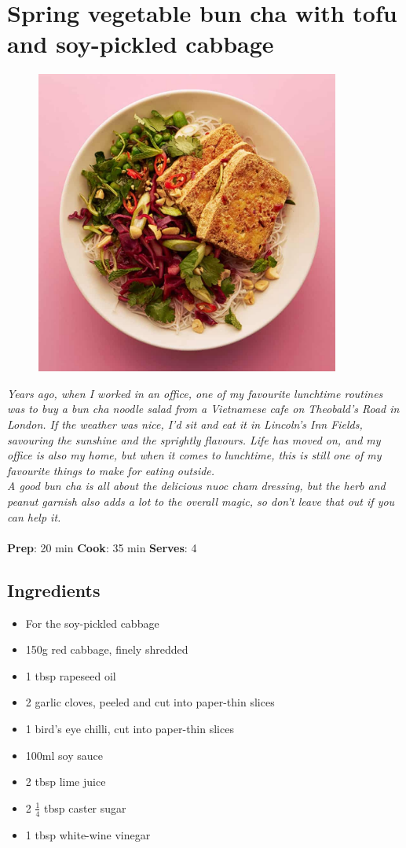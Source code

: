 \documentclass{book}
\begin{document}
\section{Spring vegetable bun cha with tofu and soy-pickled cabbage}
\begin{figure}
\centering\includegraphics[width=10cm,height=10cm,keepaspectratio]{Recipe_Pictures/Spring_vegetable_bun_cha_with_tofu_and_soy-pickled_cabbage.png}
\end{figure}
\emph{Years ago, when I worked in an office, one of my favourite lunchtime routines was to buy a bun cha noodle salad from a Vietnamese cafe on Theobald’s Road in London. If the weather was nice, I’d sit and eat it in Lincoln’s Inn Fields, savouring the sunshine and the sprightly flavours. Life has moved on, and my office is also my home, but when it comes to lunchtime, this is still one of my favourite things to make for eating outside.\\ 
A good bun cha is all about the delicious nuoc cham dressing, but the herb and peanut garnish also adds a lot to the overall magic, so don’t leave that out if you can help it.}\\\\ 
\textbf{Prep}: 20 min
\textbf{Cook}: 35 min
\textbf{Serves}: 4
\subsection*{Ingredients}
\begin{itemize}
\item For the soy-pickled cabbage 
\item 150g red cabbage, finely shredded 
\item 1 tbsp rapeseed oil 
\item 2 garlic cloves, peeled and cut into paper-thin slices
\item 1 bird’s eye chilli, cut into paper-thin slices
\item 100ml soy sauce
\item 2 tbsp lime juice 
\item 2 $\frac{1}{4}$ tbsp caster sugar 
\item 1 tbsp white-wine vinegar 
\end{itemize}
\end{document}
